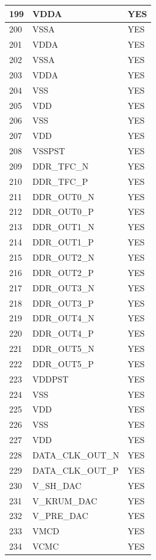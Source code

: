 \documentclass{lhcbnote}
\begin{document}
\begin{longtable}{ | l | l | l | }
	199 & VDDA & YES \\ \hline
	200 & VSSA & YES \\ \hline
	201 & VDDA & YES \\ \hline
	202 & VSSA & YES \\ \hline
	203 & VDDA & YES \\ \hline
	204 & VSS & YES \\ \hline
	205 & VDD & YES \\ \hline
	206 & VSS & YES \\ \hline
	207 & VDD & YES \\ \hline
	208 & VSSPST & YES \\ \hline
	209 & DDR\_TFC\_N & YES \\ \hline
	210 & DDR\_TFC\_P & YES \\ \hline
	211 & DDR\_OUT0\_N & YES \\ \hline
	212 & DDR\_OUT0\_P & YES \\ \hline
	213 & DDR\_OUT1\_N & YES \\ \hline
	214 & DDR\_OUT1\_P & YES \\ \hline
	215 & DDR\_OUT2\_N & YES \\ \hline
	216 & DDR\_OUT2\_P & YES \\ \hline
	217 & DDR\_OUT3\_N & YES \\ \hline
	218 & DDR\_OUT3\_P & YES \\ \hline
	219 & DDR\_OUT4\_N & YES \\ \hline
	220 & DDR\_OUT4\_P & YES \\ \hline
	221 & DDR\_OUT5\_N & YES \\ \hline
	222 & DDR\_OUT5\_P & YES \\ \hline
	223 & VDDPST & YES \\ \hline
	224 & VSS & YES \\ \hline
	225 & VDD & YES \\ \hline
	226 & VSS & YES \\ \hline
	227 & VDD & YES \\ \hline
	228 & DATA\_CLK\_OUT\_N & YES \\ \hline
	229 & DATA\_CLK\_OUT\_P & YES \\ \hline
	230 & V\_SH\_DAC & YES \\ \hline
	231 & V\_KRUM\_DAC & YES \\ \hline
	232 & V\_PRE\_DAC & YES \\ \hline
	233 & VMCD & YES \\ \hline
	234 & VCMC & YES \\ \hline

\end{longtable}
\end{document}
